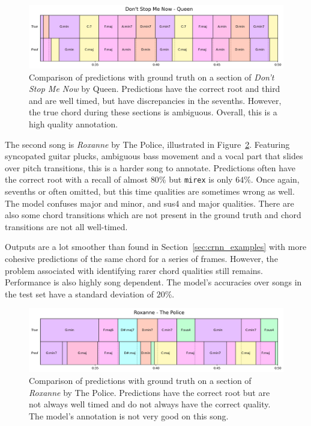 \begin{figure}[H]
    \centering
    \includegraphics[width=1.0\textwidth]{figures/dontstopmenow.png}
    \caption{Comparison of predictions with ground truth on a section of \emph{Don't Stop Me Now} by Queen. Predictions have the correct root and third and are well timed, but have discrepancies in the sevenths. However, the true chord during these sections is ambiguous. Overall, this is a high quality annotation. }\label{fig:dontstopmenow}
\end{figure}

The second song is \emph{Roxanne} by The Police, illustrated in Figure~\ref{fig:roxanne}. Featuring syncopated guitar plucks, ambiguous bass movement and a vocal part that slides over pitch transitions, this is a harder song to annotate. Predictions often have the correct root with a recall of almost $80\%$ but \texttt{mirex} is only $64\%$. Once again, sevenths or often omitted, but this time qualities are sometimes wrong as well. The model confuses major and minor, and sus4 and major qualities. There are also some chord transitions which are not present in the ground truth and chord transitions are not all well-timed.

Outputs are a lot smoother than found in Section~\ref{sec:crnn_examples} with more cohesive predictions of the same chord for a series of frames. However, the problem associated with identifying rarer chord qualities still remains. Performance is also highly song dependent. The model's accuracies over songs in the test set have a standard deviation of $20\%$. 

\begin{figure}[H]
    \centering
    \includegraphics[width=1.0\textwidth]{figures/roxanne_thepolice.png}
    \caption{Comparison of predictions with ground truth on a section of \emph{Roxanne} by The Police. Predictions have the correct root but are not always well timed and do not always have the correct quality. The model's annotation is not very good on this song. }\label{fig:roxanne}
\end{figure}


